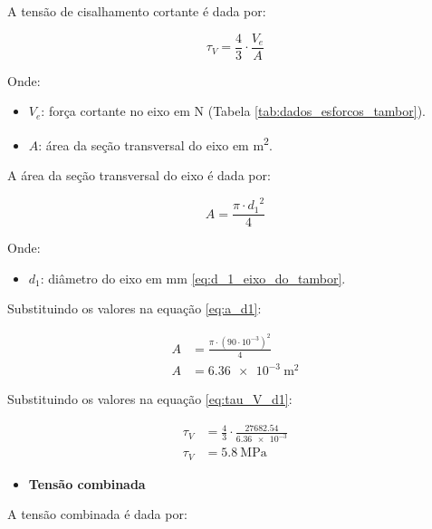 A tensão de cisalhamento cortante é dada por:

\begin{equation}
  \tau_V = \frac{4}{3} \cdot \frac{V_e}{A}
  \label{eq:tau_V_d1}
\end{equation}

Onde:

\begin{itemize}
  \item $V_e$: força cortante no eixo em \si{\newton} (Tabela \ref{tab:dados_esforcos_tambor}).
  \item $A$: área da seção transversal do eixo em \si{\meter^2}.
\end{itemize}

\vspace{1em}

A área da seção transversal do eixo é dada por:

\begin{equation}
  A = \frac{\pi \cdot {d_1}^2}{4}
  \label{eq:a_d1}
\end{equation}

Onde:

\begin{itemize}
  \item $d_1$: diâmetro do eixo em \si{\milli\meter} \eqref{eq:d_1_eixo_do_tambor}.
\end{itemize}

\vspace{1em}

Substituindo os valores na equação \eqref{eq:a_d1}:

\begin{align*}
  A & = \frac{\pi \cdot {\left( 90 \cdot 10^{-3} \right)}^2}{4} \\
  A & = \boxed{\SI{6.36e-3}{\meter^2}}
\end{align*}

Substituindo os valores na equação \eqref{eq:tau_V_d1}:

\begin{align*}
  \tau_V & = \frac{4}{3} \cdot \frac{\num{27682.54}}{\num{6.36e-3}} \\
  \tau_V & = \boxed{\SI{5.8}{\mega\pascal}}
\end{align*}

\begin{itemize}
  \item \textbf{Tensão combinada}
\end{itemize}

A tensão combinada é dada por:

